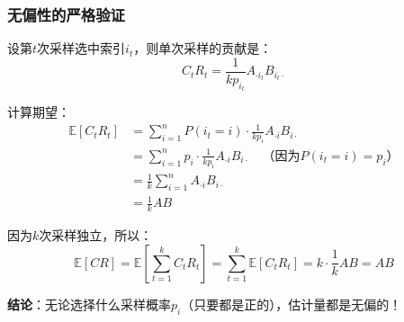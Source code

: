 \documentclass[11pt,a4paper]{ctexart}
\theoremstyle{definition}
\theoremstyle{remark}
\begin{document}
\subsubsection{无偏性的严格验证}

设第$t$次采样选中索引$i_t$，则单次采样的贡献是：
\[
C_t R_t = \frac{1}{k p_{i_t}} A_{\cdot i_t} B_{i_t \cdot}
\]

计算期望：
\begin{align*}
\mathbb{E}[C_t R_t] &= \sum_{i=1}^n P(i_t = i) \cdot \frac{1}{k p_i} A_{\cdot i} B_{i \cdot} \\
&= \sum_{i=1}^n p_i \cdot \frac{1}{k p_i} A_{\cdot i} B_{i \cdot} \quad \text{（因为$P(i_t = i) = p_i$）}\\
&= \frac{1}{k} \sum_{i=1}^n A_{\cdot i} B_{i \cdot} \\
&= \frac{1}{k} AB
\end{align*}

因为$k$次采样独立，所以：
\[
\mathbb{E}[CR] = \mathbb{E}\left[\sum_{t=1}^k C_t R_t\right] = \sum_{t=1}^k \mathbb{E}[C_t R_t] = k \cdot \frac{1}{k} AB = AB
\]

\textbf{结论}：无论选择什么采样概率$p_i$（只要都是正的），估计量都是无偏的！
\end{document}
